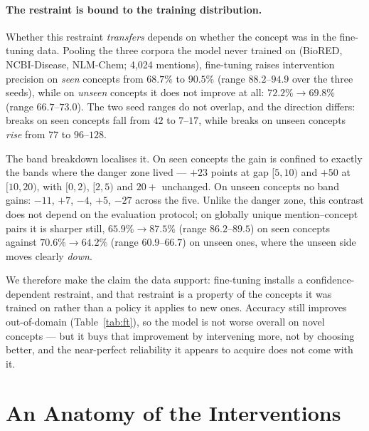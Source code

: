 \documentclass[11pt]{article}
\begin{document}
\paragraph{The restraint is bound to the training distribution.}
Whether this restraint \emph{transfers} depends on whether the concept was in the
fine-tuning data. Pooling the three corpora the model never trained on (BioRED,
NCBI-Disease, NLM-Chem; 4{,}024 mentions), fine-tuning raises intervention precision on
\emph{seen} concepts from $68.7\%$ to $90.5\%$ (range $88.2$--$94.9$ over the three
seeds), while on \emph{unseen} concepts it does not improve at all: $72.2\% \to 69.8\%$
(range $66.7$--$73.0$). The two seed ranges do not overlap, and the direction differs:
breaks on seen concepts fall from $42$ to $7$--$17$, while breaks on unseen concepts
\emph{rise} from $77$ to $96$--$128$.

The band breakdown localises it. On seen concepts the gain is confined to exactly the
bands where the danger zone lived --- $+23$ points at gap $[5,10)$ and $+50$ at
$[10,20)$, with $[0,2)$, $[2,5)$ and $20+$ unchanged. On unseen concepts no band gains:
$-11$, $+7$, $-4$, $+5$, $-27$ across the five. Unlike the danger zone, this contrast
does not depend on the evaluation protocol; on globally unique mention--concept pairs it
is sharper still, $65.9\% \to 87.5\%$ (range $86.2$--$89.5$) on seen concepts against
$70.6\% \to 64.2\%$ (range $60.9$--$66.7$) on unseen ones, where the unseen side moves
clearly \emph{down}.

We therefore make the claim the data support: fine-tuning installs a
confidence-dependent restraint, and that restraint is a property of the concepts it was
trained on rather than a policy it applies to new ones. Accuracy still improves
out-of-domain (Table~\ref{tab:ft}), so the model is not worse overall on novel concepts
--- but it buys that improvement by intervening more, not by choosing better, and the
near-perfect reliability it appears to acquire does not come with it.

\section{An Anatomy of the Interventions}\label{sec:f3}
\end{document}
